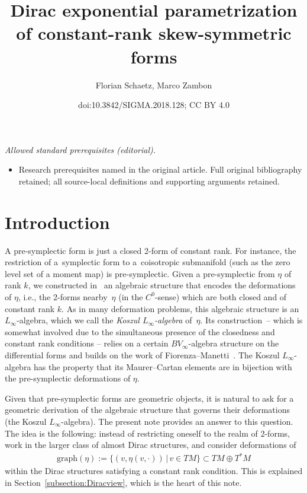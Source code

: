 \documentclass[10pt,a4paper]{amsart}
\title{Dirac exponential parametrization of constant-rank skew-symmetric forms}
\author{Florian Schaetz, Marco Zambon}
\date{doi:10.3842/SIGMA.2018.128; CC BY 4.0}
\numberwithin{equation}{section}
\renewcommand{\graph}{\mathrm{graph}}
\renewcommand{\graph}{\mathrm{graph}}
\begin{document}
\maketitle
\noindent\textit{Allowed standard prerequisites (editorial).}\begin{itemize}
\item Research prerequisites named in the original article. Full original bibliography retained; all source-local definitions and supporting arguments retained.
\end{itemize}\medskip
\section{Introduction}

A pre-symplectic form is just a closed 2-form of constant rank. For instance, the restriction of a~symplectic form to a~coisotropic submanifold (such as the zero level set of a moment map) is pre-symplectic. Given a pre-symplectic from $\eta$ of rank $k$, we constructed in~\cite{SZPre} an algebraic structure that encodes the deformations of $\eta$, i.e., the 2-forms nearby~$\eta$ (in the $C^0$-sense) which are both closed and of constant rank $k$. As in many deformation problems, this algebraic structure is an $L_{\infty}$-algebra, which we call the \emph{Koszul $L_{\infty}$-algebra} of~$\eta$. Its construction~-- which is somewhat involved due to the simultaneous presence of the closedness and constant rank conditions -- relies on a certain $BV_{\infty}$-algebra structure on the differential forms and builds on the work of Fiorenza--Manetti~\cite{Fiorenza--Manetti}. The Koszul $L_{\infty}$-algebra has the property that its Maurer--Cartan elements are in bijection with the pre-symplectic deformations of $\eta$.

Given that pre-symplectic forms are geometric objects, it is natural to ask for a geometric derivation of the algebraic structure that governs their deformations (the Koszul $L_{\infty}$-algebra). The present note provides an answer to this question. The idea is the following: instead of restricting oneself to the realm of 2-forms, work in the larger class of almost Dirac structures, and consider deformations of
 \begin{gather*}\graph(\eta) := \{(v,\eta(v,\cdot)) \, | \, v \in TM \} \subset TM \oplus T^*M\end{gather*}
 within the Dirac structures satisfying a constant rank condition. This is explained in Section~\ref{subsection:Diracview}, which is the heart of this note.
\end{document}
